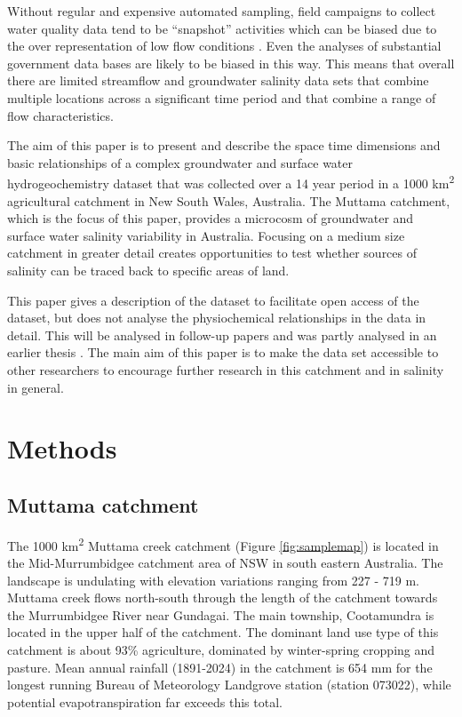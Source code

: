 \documentclass[, manuscript]{copernicus}
\begin{document}
Without regular and expensive automated sampling, field campaigns to
collect water quality data tend to be ``snapshot'' activities
\citep{Grayson1997, Breuer2015, Lyon2008, Cartwright2010, Lintern2018}
which can be biased due to the over representation of low flow
conditions \citep{Lessels2020}. Even the analyses of substantial
government data bases \citep{Lintern2018} are likely to be biased in
this way. This means that overall there are limited streamflow and
groundwater salinity data sets that combine multiple locations across a
significant time period and that combine a range of flow
characteristics.

The aim of this paper is to present and describe the space time
dimensions and basic relationships of a complex groundwater and surface
water hydrogeochemistry dataset that was collected over a 14 year period
in a 1000 km\textsuperscript{2} agricultural catchment in New South
Wales, Australia. The Muttama catchment, which is the focus of this
paper, provides a microcosm of groundwater and surface water salinity
variability in Australia. Focusing on a medium size catchment in greater
detail creates opportunities to test whether sources of salinity can be
traced back to specific areas of land.

This paper gives a description of the dataset to facilitate open access
of the dataset, but does not analyse the physiochemical relationships in
the data in detail. This will be analysed in follow-up papers and was
partly analysed in an earlier thesis \citep{Akter2018}. The main aim of
this paper is to make the data set accessible to other researchers to
encourage further research in this catchment and in salinity in general.

\section{Methods}

\subsection{Muttama catchment}

The 1000 km\textsuperscript{2} Muttama creek catchment (Figure
\ref{fig:samplemap}) is located in the Mid-Murrumbidgee catchment area
of NSW in south eastern Australia. The landscape is undulating with
elevation variations ranging from 227 - 719 m. Muttama creek flows
north-south through the length of the catchment towards the Murrumbidgee
River near Gundagai. The main township, Cootamundra is located in the
upper half of the catchment. The dominant land use type of this
catchment is about 93\% agriculture, dominated by winter-spring cropping
and pasture. Mean annual rainfall (1891-2024) in the catchment is 654 mm
for the longest running Bureau of Meteorology Landgrove station (station
073022), while potential evapotranspiration far exceeds this total.
\end{document}
